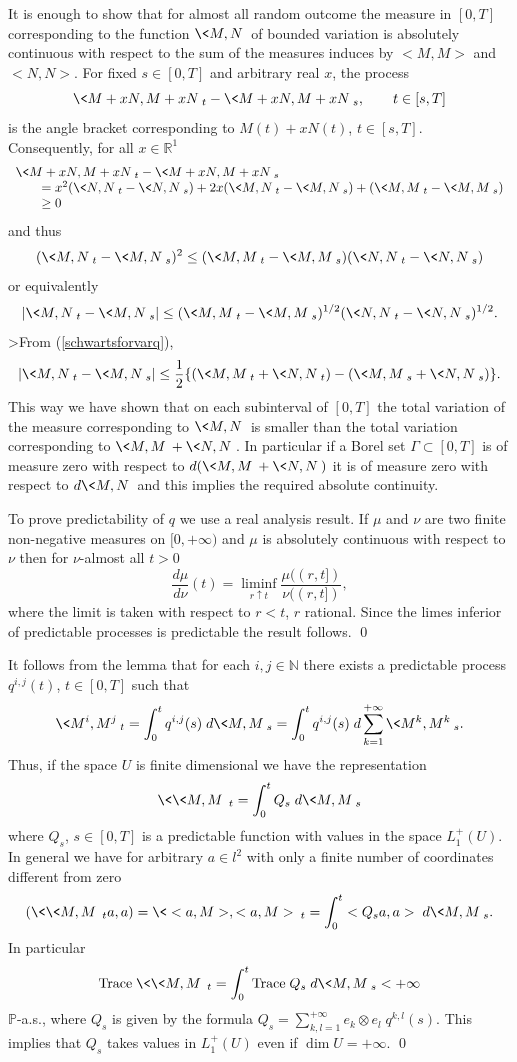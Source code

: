 \documentclass[preprint]{imsart}
\def\P{\mathbb P}
\def\N{\mathbb N}
\def\R{\mathbb R}
\begin{document}
{
It is enough to show that for almost all random outcome
the measure in $[0,T]$ corresponding to the function
$\<M,N\>$ of bounded variation is absolutely continuous with
respect to the sum of the measures induces by $<M,M>$ and $<N,N>$.
For fixed $s\in [0,T]$ and arbitrary real $x$, the process
$$
\<M+xN, M+xN\>_t - \<M+xN, M+xN\>_s,\qquad
t\in [s,T]
$$
is the angle bracket corresponding to
$M(t)+xN(t)$, $t\in [s,T]$. Consequently, for all $x\in \R^1$
$$
\begin{array}{l}
  \<M+xN, M+xN\>_t-\<M+xN, M+xN\>_s\\
  \qquad =x^2(  \<N,N\>_t-\<N, N\>_s)
  +2x(  \<M, N\>_t-\<M, N\>_s)
  +(  \<M, M\>_t-\<M, M\>_s)
  \\
  \qquad \geq 0
\end{array}
$$
and thus
$$
(  \<M, N\>_t-\<M, N\>_s)^2\leq
(  \<M, M\>_t-\<M, M\>_s)
(  \<N,N\>_t-\<N, N\>_s)
$$
or equivalently
\begin{equation}\label{schwartsforvarq}
|  \<M, N\>_t-\<M, N\>_s|\leq
(  \<M, M\>_t-\<M, M\>_s)^{1/2}
(  \<N,N\>_t-\<N, N\>_s)^{1/2}.
\end{equation}
>From (\ref{schwartsforvarq}),
$$
|  \<M, N\>_t-\<M, N\>_s|\leq\frac{1}{2}\{
(  \<M, M\>_t+\<N, N\>_t)-
(  \<M,M\>_s+\<N, N\>_s)\}.
$$
This way we have shown that on each subinterval of $[0,T]$ the
 total
variation of the measure corresponding to $\<M,N\>$ is smaller
than the total variation corresponding to $\<M,M\>+\<N,N\>$. In
particular if a Borel set $\Gamma\subset [0,T]$ is of measure zero
with respect to $d(\<M,M\>+\<N,N\>)$ it is of measure zero
with respect to $d\<M,N\>$ and this implies the required absolute
continuity.

To prove predictability of $q$ we use a real analysis result. If
$\mu$ and $\nu$ are two finite non-negative measures on
$[0,+\infty)$ and $\mu$ is absolutely continuous with respect to
$\nu$ then for $\nu$-almost all $t>0$
$$
\frac{d\mu}{d\nu}(t) = \liminf_{r\uparrow t}
\frac{\mu((r,t])}{\nu((r,t])},
$$
where the limit is taken with respect to $r<t$, $r$ rational.
Since the limes inferior of predictable processes is predictable
the result follows.
 \qed

It follows from the lemma that for each $i,j\in\N$ there exists a
predictable process $q^{i,j}(t)$, $t\in [0,T]$ such that
$$
\<M^i,M^j\>_t=\int_0^tq^{i,j}(s)\; d\<M,M\>_s
=\int_0^tq^{i,j}(s)\; d\sum_{k=1}^{+\infty}\<M^k,M^k\>_s.
$$
Thus, if the space $U$ is finite dimensional we have the
representation
$$
 \<\<M,M\>\>_t=\int_0^tQ_s\; d\<M,M\>_s
 $$
 where $Q_s$, $s\in [0,T]$ is a predictable function with values
 in the space $L_1^+(U)$. In general we have for arbitrary
 $a\in l^2$ with only a finite number of coordinates different
 from zero
 $$
(\<\<M,M\>\>_ta,a) = \< <a,M>, <a,M> \>_t=
\int_0^t <Q_sa,a> \; d\<M,M\>_s.
$$
In particular
$$
{\rm Trace \;} \<\<M,M\>\>_t =\int_0^t{\rm Trace\;}Q_s\; d\<M,M\>_s
<+\infty
$$
$\P$-a.s.,
where  $Q_s$ is given by the formula
$ Q_s=\sum_{k,l=1}^{+\infty}e_k\otimes e_l
  \; q^{k,l}(s)$.
 This implies that $Q_s$ takes values in $L_1^+(U)$ even
if $\dim U=+\infty$.
 \qed
}
\end{document}
